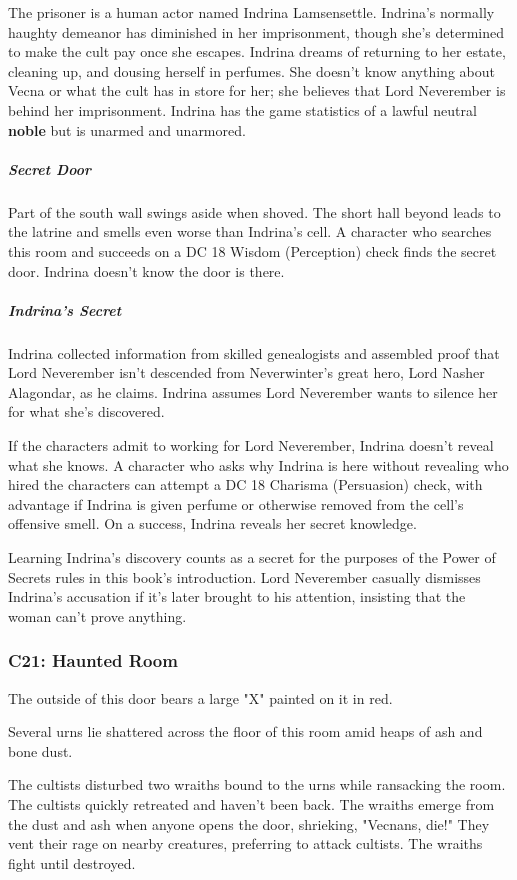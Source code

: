 \documentclass[10pt,a4paper,twoside,bg=print,twocolumn,openany,nodeprecatedcode]{dndbook}
\begin{document}
The prisoner is a human actor named Indrina Lamsensettle. Indrina's normally haughty demeanor has diminished in her imprisonment, though she's determined to make the cult pay once she escapes. Indrina dreams of returning to her estate, cleaning up, and dousing herself in perfumes. She doesn't know anything about Vecna or what the cult has in store for her; she believes that Lord Neverember is behind her imprisonment. Indrina has the game statistics of a lawful neutral \textbf{noble} but is unarmed and unarmored.

\subparagraph{Secret Door}
Part of the south wall swings aside when shoved. The short hall beyond leads to the latrine and smells even worse than Indrina's cell. A character who searches this room and succeeds on a DC 18 Wisdom (Perception) check finds the secret door. Indrina doesn't know the door is there.

\subparagraph{Indrina's Secret}
Indrina collected information from skilled genealogists and assembled proof that Lord Neverember isn't descended from Neverwinter's great hero, Lord Nasher Alagondar, as he claims. Indrina assumes Lord Neverember wants to silence her for what she's discovered.

If the characters admit to working for Lord Neverember, Indrina doesn't reveal what she knows. A character who asks why Indrina is here without revealing who hired the characters can attempt a DC 18 Charisma (Persuasion) check, with advantage if Indrina is given perfume or otherwise removed from the cell's offensive smell. On a success, Indrina reveals her secret knowledge.

Learning Indrina's discovery counts as a secret for the purposes of the Power of Secrets rules in this book's introduction. Lord Neverember casually dismisses Indrina's accusation if it's later brought to his attention, insisting that the woman can't prove anything.

\subsubsection{C21: Haunted Room}
The outside of this door bears a large "X" painted on it in red.

\begin{DndReadAloud}{}
Several urns lie shattered across the floor of this room amid heaps of ash and bone dust.

\end{DndReadAloud}

The cultists disturbed two wraiths bound to the urns while ransacking the room. The cultists quickly retreated and haven't been back. The wraiths emerge from the dust and ash when anyone opens the door, shrieking, "Vecnans, die!" They vent their rage on nearby creatures, preferring to attack cultists. The wraiths fight until destroyed.
\end{document}
